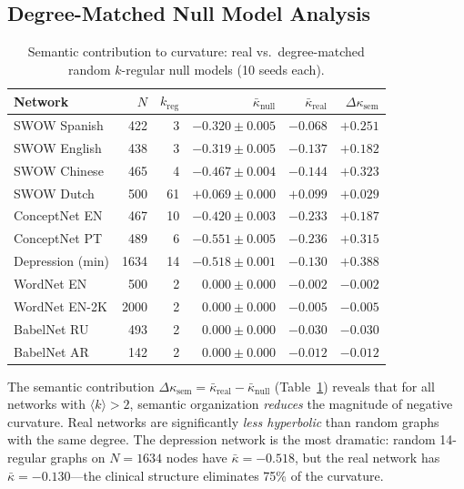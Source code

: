 \documentclass[11pt,a4paper]{article}
\newcommand{\kbar}{\bar{\kappa}}
\newcommand{\kavg}{\langle k \rangle}
\newcommand{\Dksem}{\Delta\kappa_{\text{sem}}}
\begin{document}
\subsection{Degree-Matched Null Model Analysis}

\begin{table}[t]
\centering
\caption{Semantic contribution to curvature: real vs.\ degree-matched random $k$-regular null models (10 seeds each).}
\label{tab:nulls}
\small
\begin{tabular}{@{}lrrrrr@{}}
\toprule
Network & $N$ & $k_{\mathrm{reg}}$ & $\kbar_{\mathrm{null}}$ & $\kbar_{\mathrm{real}}$ & $\Dksem$ \\
\midrule
SWOW Spanish & 422 & 3 & $-0.320 \pm 0.005$ & $-0.068$ & $+0.251$ \\
SWOW English & 438 & 3 & $-0.319 \pm 0.005$ & $-0.137$ & $+0.182$ \\
SWOW Chinese & 465 & 4 & $-0.467 \pm 0.004$ & $-0.144$ & $+0.323$ \\
SWOW Dutch & 500 & 61 & $+0.069 \pm 0.000$ & $+0.099$ & $+0.029$ \\
ConceptNet EN & 467 & 10 & $-0.420 \pm 0.003$ & $-0.233$ & $+0.187$ \\
ConceptNet PT & 489 & 6 & $-0.551 \pm 0.005$ & $-0.236$ & $+0.315$ \\
Depression (min) & 1634 & 14 & $-0.518 \pm 0.001$ & $-0.130$ & $+0.388$ \\
WordNet EN & 500 & 2 & $0.000 \pm 0.000$ & $-0.002$ & $-0.002$ \\
WordNet EN-2K & 2000 & 2 & $0.000 \pm 0.000$ & $-0.005$ & $-0.005$ \\
BabelNet RU & 493 & 2 & $0.000 \pm 0.000$ & $-0.030$ & $-0.030$ \\
BabelNet AR & 142 & 2 & $0.000 \pm 0.000$ & $-0.012$ & $-0.012$ \\
\bottomrule
\end{tabular}
\end{table}

The semantic contribution $\Dksem = \kbar_{\mathrm{real}} - \kbar_{\mathrm{null}}$ (Table~\ref{tab:nulls}) reveals that for all networks with $\kavg > 2$, semantic organization \emph{reduces} the magnitude of negative curvature. Real networks are significantly \emph{less hyperbolic} than random graphs with the same degree. The depression network is the most dramatic: random 14-regular graphs on $N=1634$ nodes have $\kbar = -0.518$, but the real network has $\kbar = -0.130$---the clinical structure eliminates 75\% of the curvature.
\end{document}
